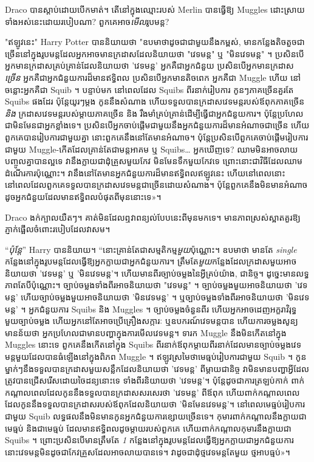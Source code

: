 {Draco បានស្តាប់ដោយបើកមាត់។ តើនៅក្នុងឈ្មោះរបស់ Merlin បានធ្វើឱ្យ Muggles ដោះស្រាយទាំងអស់នេះដោយរបៀបណា? ពួកគេអាច\emph{មើល}រូបមន្ត?

"ឥឡូវនេះ" Harry Potter បាននិយាយថា "ឧបមាថាដូចជាជាមួយនឹងកម្ពស់, មានកន្លែងតិចតួចជាច្រើននៅក្នុងរូបមន្តដែលអ្នកអាចមានក្រដាសដែលនិយាយថា "វេទមន្ត" ឬ "មិនវេទមន្ត" ។ ប្រសិនបើអ្នកមានក្រដាសគ្រប់គ្រាន់ដែលនិយាយថា 'វេទមន្ត' អ្នកគឺជាអ្នកជំនួយ ប្រសិនបើអ្នកមានក្រដាស \emph{ច្រើន} អ្នកគឺជាអ្នកជំនួយការដ៏មានឥទ្ធិពល ប្រសិនបើអ្នកមានតិចពេក អ្នកគឺជា Muggle ហើយ នៅចន្លោះអ្នកគឺជា Squib ។ បន្ទាប់មក នៅពេលដែល Squibs ពីរនាក់រៀបការ កូនៗភាគច្រើនគួរតែ Squibs ផងដែរ ប៉ុន្តែយូរៗម្តង កូននឹងសំណាង ហើយទទួលបានក្រដាសវេទមន្តរបស់ឪពុកភាគច្រើន \emph{និង} ក្រដាសវេទមន្តរបស់ម្តាយភាគច្រើន និង រឹងមាំគ្រប់គ្រាន់ដើម្បីធ្វើជាអ្នកជំនួយការ។ ប៉ុន្តែប្រហែលជាមិនមែនជាអ្នកខ្លាំងទេ។ ប្រសិនបើអ្នកចាប់ផ្តើមជាមួយនឹងអ្នកជំនួយការដ៏មានអំណាចជាច្រើន ហើយពួកគេបានរៀបការជាមួយគ្នា នោះពួកគេនឹងនៅតែមានអំណាច។ ប៉ុន្តែប្រសិនបើពួកគេចាប់ផ្តើមរៀបការជាមួយ Muggle-កើតដែលគ្រាន់តែជាមន្តអាគម ឬ Squibs… អ្នកឃើញទេ? ឈាម​មិន​អាច​លាយ​បញ្ចូល​គ្នា​បាន​ល្អ​ទេ វា​នឹង​ក្លាយ​ជា​ដុំ​គ្រួស​មួយ​កែវ មិន​មែន​ទឹក​មួយ​កែវ​ទេ ព្រោះ​នោះ​ជា​វិធី​ដែល​ឈាម​ដំណើរការ​ប៉ុណ្ណោះ។ វានឹងនៅតែមានអ្នកជំនួយការដ៏មានឥទ្ធិពលឥឡូវនេះ ហើយនៅពេលនោះ នៅពេលដែលពួកគេទទួលបានក្រដាសវេទមន្តជាច្រើនដោយសំណាង។ ប៉ុន្តែ​ពួក​គេ​នឹង​មិន​មាន​អំណាច​ដូច​អ្នក​ជំនួយ​ដែល​មាន​ឥទ្ធិពល​បំផុត​ពី​មុន​នោះ​ទេ»។

Draco ងក់ក្បាលយឺតៗ។ គាត់​មិន​ដែល​ឮ​វា​ពន្យល់​បែប​នេះ​ពី​មុន​មក​ទេ។ មានភាពស្រស់ស្អាតគួរឱ្យភ្ញាក់ផ្អើលចំពោះរបៀបដែលវាសម។

“\emph{ប៉ុន្តែ}” Harry បាននិយាយ។ “នោះគ្រាន់តែជាសម្មតិកម្ម\emph{មួយ}ប៉ុណ្ណោះ។ ឧបមាថា មានតែ \emph{single} កន្លែងនៅក្នុងរូបមន្តដែលធ្វើឱ្យអ្នកក្លាយជាអ្នកជំនួយការ។ ត្រឹមតែ\emph{មួយ}កន្លែងដែលក្រដាសមួយអាចនិយាយថា 'វេទមន្ត' ឬ 'មិនវេទមន្ត'។ ហើយមានពីរច្បាប់ចម្លងនៃអ្វីគ្រប់យ៉ាង, ជានិច្ច។ ដូច្នេះមានលទ្ធភាពតែបីប៉ុណ្ណោះ។ ច្បាប់ចម្លងទាំងពីរអាចនិយាយថា "វេទមន្ត" ។ ច្បាប់ចម្លងមួយអាចនិយាយថា 'វេទមន្ត' ហើយច្បាប់ចម្លងមួយអាចនិយាយថា 'មិនវេទមន្ត' ។ ឬច្បាប់ចម្លងទាំងពីរអាចនិយាយថា 'មិនវេទមន្ត' ។ អ្នកជំនួយការ Squibs និង Muggles ។ ច្បាប់ចម្លងចំនួនពីរ ហើយអ្នកអាចដេញអក្ខរាវិរុទ្ធ មួយច្បាប់ចម្លង ហើយអ្នកនៅតែអាចប្រើគ្រឿងសក្ការៈ ឬឧបករណ៍វេទមន្តបាន ហើយការចម្លងសូន្យមានន័យថា អ្នកប្រហែលជាមានបញ្ហាក្នុងការមើលវេទមន្ត។ ទារក Muggle នឹងមិនកើតនៅក្នុង Muggles នោះទេ ពួកគេនឹងកើតនៅក្នុង Squibs ពីរនាក់ឪពុកម្តាយពីរនាក់ដែលមានច្បាប់ចម្លងវេទមន្តមួយដែលបានធំឡើងនៅក្នុងពិភព Muggle ។ ឥឡូវស្រមៃថាមេធ្មប់រៀបការជាមួយ Squib ។ កូនម្នាក់ៗនឹងទទួលបានក្រដាសមួយសន្លឹកដែលនិយាយថា 'វេទមន្ត' ពីម្តាយជានិច្ច វាមិនមានបញ្ហាអ្វីដែលត្រូវបានជ្រើសរើសដោយចៃដន្យនោះទេ ទាំងពីរនិយាយថា 'វេទមន្ត'។ ប៉ុន្តែ​ដូចជា​ការ​ត្រឡប់​កាក់ ពាក់កណ្តាល​ពេលដែល​កូន​នឹង​ទទួលបាន​ក្រដាស​សរសេរ​ថា 'វេទមន្ត' ពី​ឪពុក ហើយ​ពាក់កណ្តាល​ពេលដែល​កូន​នឹង​ទទួលបាន​ក្រដាស​របស់​ឪពុក​ដែល​និយាយថា 'មិនមែន​វេទមន្ត'។ នៅពេលមេធ្មប់រៀបការជាមួយ Squib លទ្ធផលនឹងមិនមានកូនអ្នកជំនួយការខ្សោយច្រើនទេ។ កុមារពាក់កណ្តាលនឹងក្លាយជាមេធ្មប់ និងជាមេធ្មប់ ដែលមានឥទ្ធិពលដូចម្តាយរបស់ពួកគេ ហើយពាក់កណ្តាលកុមារនឹងក្លាយជា Squibs ។ ព្រោះប្រសិនបើមានត្រឹមតែ \emph{1} កន្លែងនៅក្នុងរូបមន្តដែលធ្វើឱ្យអ្នកក្លាយជាអ្នកជំនួយការ នោះវេទមន្តមិនដូចជាកែវគ្រួសដែលអាចលាយបានទេ។ វា​ដូចជា​ដុំ​ថ្ម​វេទមន្ត​តែមួយ ថ្ម​អាបធ្មប់​»​។

}
